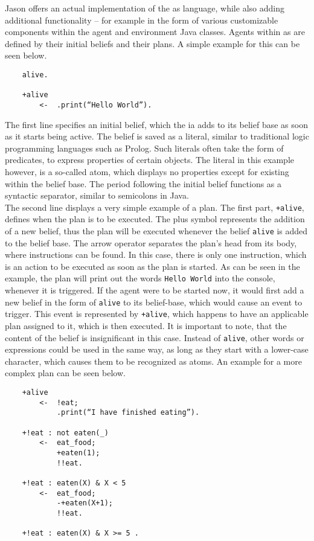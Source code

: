 \documentclass[draft,final]{vutinfth} %
\begin{document}
Jason offers an actual implementation of the \gls{as} language, while also adding additional functionality – for example in the form of various customizable components within the agent and environment Java classes. 
Agents within \gls{as} are defined by their initial beliefs and their plans. 
A simple example for this can be seen below.
\begin{verbatim}
    alive.
		
    +alive 
	    <-  .print(“Hello World”).
\end{verbatim}
The first line specifies an initial belief, which the \gls{ia} adds to its belief base as soon as it starts being active. 
The belief is saved as a literal, similar to traditional logic programming languages such as Prolog. 
Such literals often take the form of predicates, to express properties of certain objects. 
The literal in this example however, is a so-called atom, which displays no properties except for existing within the belief base. 
The period following the initial belief functions as a syntactic separator, similar to semicolons in Java. \\
The second line displays a very simple example of a plan. 
The first part, \verb|+alive|, defines when the plan is to be executed. 
The plus symbol represents the addition of a new belief, thus the plan will be executed whenever the belief \verb|alive| is added to the belief base. 
The arrow operator separates the plan’s head from its body, where instructions can be found. 
In this case, there is only one instruction, which is an action to be executed as soon as the plan is started. 
As can be seen in the example, the plan will print out the words \verb|Hello World| into the console, whenever it is triggered. 
If the agent were to be started now, it would first add a new belief in the form of \verb|alive| to its belief-base, which would cause an event to trigger. 
This event is represented by \verb|+alive|, which happens to have an applicable plan assigned to it, which is then executed. 
It is important to note, that the content of the belief is insignificant in this case. 
Instead of \verb|alive|, other words or expressions could be used in the same way, as long as they start with a lower-case character, which causes them to be recognized as atoms.
An example for a more complex plan can be seen below.
\begin{verbatim}
    +alive 
        <-  !eat;
            .print(“I have finished eating”).

    +!eat : not eaten(_)
        <-  eat_food;
            +eaten(1);
            !!eat.

    +!eat : eaten(X) & X < 5
        <-  eat_food;
            -+eaten(X+1);
            !!eat.

    +!eat : eaten(X) & X >= 5 .
\end{verbatim}
\end{document}
